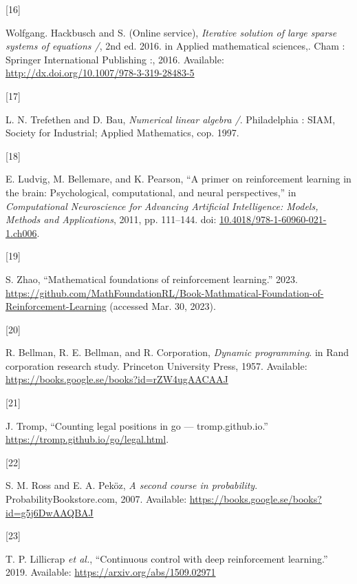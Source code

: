 \documentclass[
  letterpaper,
]{report}
\newlength{\cslhangindent}
\newlength{\csllabelwidth}
\newlength{\cslentryspacingunit} %
\newenvironment{CSLReferences}[2] %
 {%
  \setlength{\parindent}{0pt}
  \ifodd #1
  \let\oldpar\par
  \def\par{\hangindent=\cslhangindent\oldpar}
  \fi
  \setlength{\parskip}{#2\cslentryspacingunit}
 }%
 {}
\newcommand{\CSLLeftMargin}[1]{\parbox[t]{\csllabelwidth}{#1}}
\newcommand{\CSLRightInline}[1]{\parbox[t]{\linewidth - \csllabelwidth}{#1}\break}
\theoremstyle{plain}
\theoremstyle{definition}
\theoremstyle{definition}
\theoremstyle{remark}
\begin{document}
\begin{CSLReferences}{0}{0}
\leavevmode{}%
\CSLLeftMargin{{[}16{]} }%
\CSLRightInline{Wolfgang. Hackbusch and S. (Online service),
\emph{Iterative solution of large sparse systems of equations /}, 2nd
ed. 2016. in Applied mathematical sciences,. Cham : Springer
International Publishing :, 2016. Available:
\url{http://dx.doi.org/10.1007/978-3-319-28483-5}}

\leavevmode{}%
\CSLLeftMargin{{[}17{]} }%
\CSLRightInline{L. N. Trefethen and D. Bau, \emph{Numerical linear
algebra /}. Philadelphia : SIAM, Society for Industrial; Applied
Mathematics, cop. 1997.}

\leavevmode{}%
\CSLLeftMargin{{[}18{]} }%
\CSLRightInline{E. Ludvig, M. Bellemare, and K. Pearson, {``A primer on
reinforcement learning in the brain: Psychological, computational, and
neural perspectives,''} in \emph{Computational Neuroscience for
Advancing Artificial Intelligence: Models, Methods and Applications},
2011, pp. 111--144. doi:
\href{https://doi.org/10.4018/978-1-60960-021-1.ch006}{10.4018/978-1-60960-021-1.ch006}.}

\leavevmode{}%
\CSLLeftMargin{{[}19{]} }%
\CSLRightInline{S. Zhao, {``Mathematical foundations of reinforcement
learning.''} 2023.
\url{https://github.com/MathFoundationRL/Book-Mathmatical-Foundation-of-Reinforcement-Learning}
(accessed Mar. 30, 2023).}

\leavevmode{}%
\CSLLeftMargin{{[}20{]} }%
\CSLRightInline{R. Bellman, R. E. Bellman, and R. Corporation,
\emph{Dynamic programming}. in Rand corporation research study.
Princeton University Press, 1957. Available:
\url{https://books.google.se/books?id=rZW4ugAACAAJ}}

\leavevmode{}%
\CSLLeftMargin{{[}21{]} }%
\CSLRightInline{J. Tromp, {``Counting legal positions in go ---
tromp.github.io.''} \url{https://tromp.github.io/go/legal.html}.}

\leavevmode{}%
\CSLLeftMargin{{[}22{]} }%
\CSLRightInline{S. M. Ross and E. A. Peköz, \emph{A second course in
probability}. ProbabilityBookstore.com, 2007. Available:
\url{https://books.google.se/books?id=g5j6DwAAQBAJ}}

\leavevmode{}%
\CSLLeftMargin{{[}23{]} }%
\CSLRightInline{T. P. Lillicrap \emph{et al.}, {``Continuous control
with deep reinforcement learning.''} 2019. Available:
\url{https://arxiv.org/abs/1509.02971}}


\end{CSLReferences}
\end{document}
